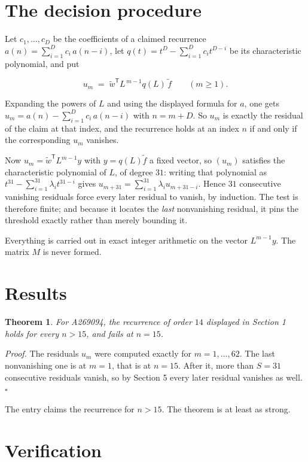 \documentclass[11pt]{article}
\newtheorem{theorem}{Theorem}
\theoremstyle{definition}
\begin{document}
\section{The decision procedure}

Let $c_1,\dots,c_D$ be the coefficients of a claimed recurrence $a(n) = \sum_{i=1}^{D} c_i\,a(n-i)$, let $q(t) = t^{D} - \sum_{i=1}^{D} c_i t^{D-i}$ be its characteristic polynomial, and put

\[u_m \;=\; \tilde w^{\mathsf T} L^{\,m-1} q(L)\,\tilde f \qquad (m \ge 1).\]

Expanding the powers of $L$ and using the displayed formula for $a$, one gets $u_m = a(n) - \sum_{i=1}^{D} c_i\,a(n-i)$ with $n = m + D$. So $u_m$ is exactly the residual of the claim at that index, and the recurrence holds at an index $n$ if and only if the corresponding $u_m$ vanishes.

Now $u_m = \tilde w^{\mathsf T} L^{m-1} y$ with $y = q(L)\tilde f$ a fixed vector, so $(u_m)$ satisfies the characteristic polynomial of $L$, of degree $31$: writing that polynomial as $t^{31} - \sum_{i=1}^{31} \lambda_i t^{31-i}$ gives $u_{m+31} = \sum_{i=1}^{31} \lambda_i u_{m+31-i}$. Hence $31$ consecutive vanishing residuals force every later residual to vanish, by induction. The test is therefore finite; and because it locates the {\itshape last} nonvanishing residual, it pins the threshold exactly rather than merely bounding it.

Everything is carried out in exact integer arithmetic on the vector $L^{m-1}y$. The matrix $M$ is never formed.

\section{Results}

\begin{theorem} For A269094, the recurrence of order $14$ displayed in Section 1 holds for every $n > 15$, and fails at $n = 15$.\end{theorem}

{\itshape Proof.} The residuals $u_m$ were computed exactly for $m = 1,\dots,62$. The last nonvanishing one is at $m = 1$, that is at $n = 15$. After it, more than $S = 31$ consecutive residuals vanish, so by Section 5 every later residual vanishes as well. $\square$

The entry claims the recurrence for $n > 15$. The theorem is at least as strong.

\section{Verification}
\end{document}
